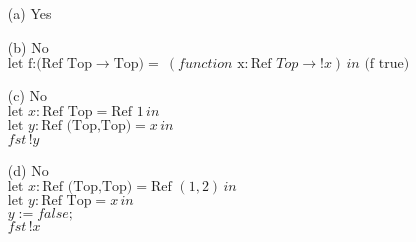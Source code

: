 \documentclass{article}
\begin{document}
\begin{description}
            \begin{enumerate}
                \item [(a)]{Yes}
                \item[(b)]{No}\\
                $\text{let f:(Ref Top} \rightarrow \text{Top)} = \ (function \text{ x}: \text{Ref }Top \rightarrow !x) \,in \text{ (f true)}$
                \item[(c)] {No}\\
                $\text{let } x: \text{Ref Top} = \text{Ref } 1 \, in $\\
                $\text{let } y: \text{Ref (Top,Top)} = x\, in$\\
                $fst\, !y$
                \item[(d)] {No}\\
                $\text{let } x: \text{Ref (Top,Top)} = \text{Ref } (1,2) \, in $\\
                $\text{let } y: \text{Ref Top} = x \,in$\\
                $y:=false;$\\
                $fst\, !x$
            \end{enumerate}
    \end{description}
\end{document}
